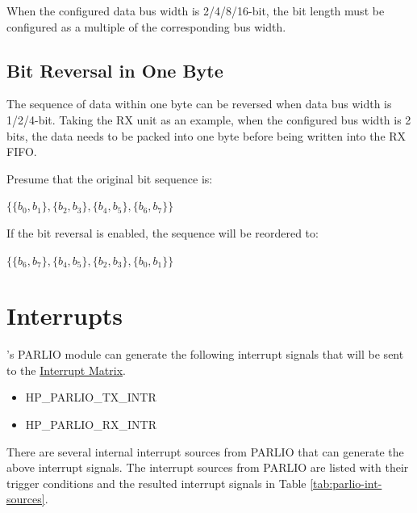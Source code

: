 \documentclass[main\_\_EN.tex]{subfiles}
\begin{document}
When the configured data bus width is 2/4/8/16-bit, the bit length must be configured as a multiple of the corresponding bus width.


\subsection{Bit Reversal in One Byte}
The sequence of data within one byte can be reversed when data bus width is 1/2/4-bit. Taking the RX unit as an example, when the configured bus width is 2 bits, the data needs to be packed into one byte before being written into the RX FIFO.

Presume that the original bit sequence is:

\begin{center}
$\{ \{ b_{0}, b_{1} \}, \{ b_{2}, b_{3} \}, \{ b_{4}, b_{5} \}, \{ b_{6}, b_{7} \} \}$
\end{center}

If the bit reversal is enabled, the sequence will be reordered to:

\begin{center}
$\{ \{ b_{6}, b_{7} \}, \{ b_{4}, b_{5} \}, \{ b_{2}, b_{3} \}, \{ b_{0}, b_{1} \} \}$
\end{center}



\section{Interrupts} \label{sec:parlio-interrupts}

\chipname{}'s PARLIO module can generate the following interrupt signals that will be sent to the \hyperref[mod:intmtrx]{Interrupt Matrix}.

    \begin{itemize}
        \item HP\_PARLIO\_TX\_INTR
        \item HP\_PARLIO\_RX\_INTR
    \end{itemize}

There are several internal interrupt sources from PARLIO that can generate the above interrupt signals. The interrupt sources from PARLIO are listed with their trigger conditions and the resulted interrupt signals in Table \ref{tab:parlio-int-sources}.
\end{document}
